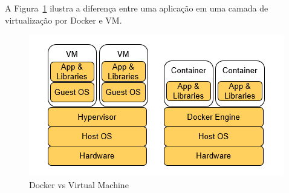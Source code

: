 \documentclass[twoside,english,brazilian]{UNISINOSmonografia}
\begin{document}
A Figura~\ref{fig:vmvsdocker} ilustra a diferença entre uma aplicação em uma camada de virtualização por Docker e VM.

\begin{figure}
	\caption{Docker vs Virtual Machine}
	\label{fig:vmvsdocker}
	\centering%
	\begin{minipage}{.4\textwidth}
		\includegraphics[width=\textwidth]{vmvsdocker}
	\end{minipage}
\end{figure}
\end{document}
